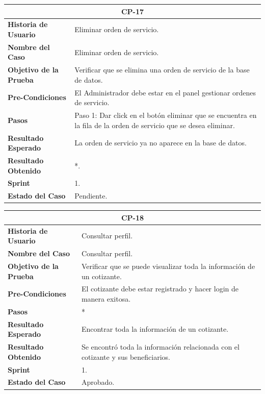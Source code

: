 \documentclass[12pt,a4paper]{article}
\begin{document}
\begin{center}
\begin{tabular}{|m{5cm}|m{9cm}|}
\hline
\multicolumn{2}{|c|}{\textbf{CP-17}} \\
\hline
\textbf{Historia de Usuario} & Eliminar orden de servicio. \\
\hline
\textbf{Nombre del Caso} & Eliminar orden de servicio. \\
\hline
\textbf{Objetivo de la Prueba} &  Verificar que se elimina una orden de servicio de la base de datos.\\
\hline
\textbf{Pre-Condiciones} & El Administrador debe estar en el panel gestionar ordenes de servicio. \\
\hline
\textbf{Pasos} & Paso 1: Dar click en el botón eliminar que se encuentra en la fila de la orden de servicio que se desea eliminar. \\
\hline
\textbf{Resultado Esperado} & La orden de servicio ya no aparece en la base de datos. \\
\hline
\textbf{Resultado Obtenido} & *. \\
\hline
\textbf{Sprint} & 1. \\
\hline
\textbf{Estado del Caso} & Pendiente. \\
\hline
\end{tabular}
\vspace{5mm}

\begin{tabular}{|m{5cm}|m{9cm}|}
\hline
\multicolumn{2}{|c|}{\textbf{CP-18}} \\
\hline
\textbf{Historia de Usuario} & Consultar perfil. \\
\hline
\textbf{Nombre del Caso} & Consultar perfil. \\
\hline
\textbf{Objetivo de la Prueba} & Verificar que se puede visualizar toda la información de un cotizante.\\
\hline
\textbf{Pre-Condiciones} & El cotizante debe estar registrado y hacer login de manera exitosa.\\
\hline
\textbf{Pasos} & * \\
\hline
\textbf{Resultado Esperado} & Encontrar toda la información de un cotizante. \\
\hline
\textbf{Resultado Obtenido} & Se encontró toda la información relacionada con el cotizante y sus beneficiarios. \\
\hline
\textbf{Sprint} & 1. \\
\hline
\textbf{Estado del Caso} & Aprobado. \\
\hline
\end{tabular}
\vspace{5mm}


\end{center}
\end{document}
